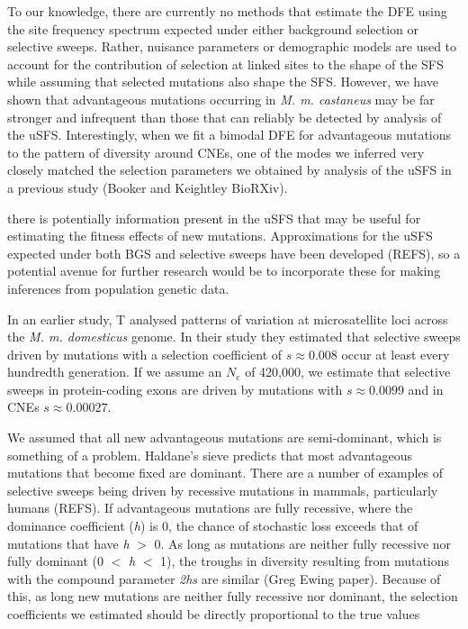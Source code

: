 To our knowledge, there are currently no methods that estimate the DFE using the site frequency spectrum expected under either background selection or selective sweeps. Rather, nuisance parameters or demographic models are used to account for the contribution of selection at linked sites to the shape of the SFS while assuming that selected mutations also shape the SFS. 
However, we have shown that advantageous mutations occurring in \textit{M. m. castaneus} may be far stronger and infrequent than those that can reliably be detected by analysis of the uSFS. Interestingly, when we fit a bimodal DFE for advantageous mutations to the pattern of diversity around CNEs, one of the modes we inferred very closely matched the selection parameters we obtained by analysis of the uSFS in a previous study (Booker and Keightley BioRXiv).

there is potentially information present in the uSFS that may be useful for estimating the fitness effects of new mutations. Approximations for the uSFS expected under both BGS and selective sweeps have been developed (REFS), so a potential avenue for further research would be to incorporate these for making inferences from population genetic data.

In an earlier study, T\cite{RN355} analysed patterns of variation at microsatellite loci across the \textit{M. m. domesticus} genome. In their study they estimated that selective sweeps driven by mutations with a selection coefficient of $s \approx 0.008$ occur at least every hundredth generation. If we assume an $N_e$ of 420,000, we estimate that selective sweeps in protein-coding exons are driven by mutations with $s \approx 0.0099$ and in CNEs $s \approx 0.00027$.

We assumed that all new advantageous mutations are semi-dominant, which is something of a problem. Haldane's sieve predicts that most advantageous mutations that become fixed are dominant. There are a number of examples of selective sweeps being driven by recessive mutations in mammals, particularly humans (REFS). If advantageous mutations are fully recessive, where the dominance coefficient (\textit{h}) is 0, the chance of stochastic loss exceeds that of mutations that have \textit{h} $>$ 0. As long as mutations are neither fully recessive nor fully dominant (0 $<$ \textit{h} $<$ 1), the troughs in diversity resulting from mutations with the compound parameter \textit{2hs} are similar (Greg Ewing paper). Because of this, as long new mutations are neither fully recessive nor dominant, the selection coefficients we estimated should be directly proportional to the true values

